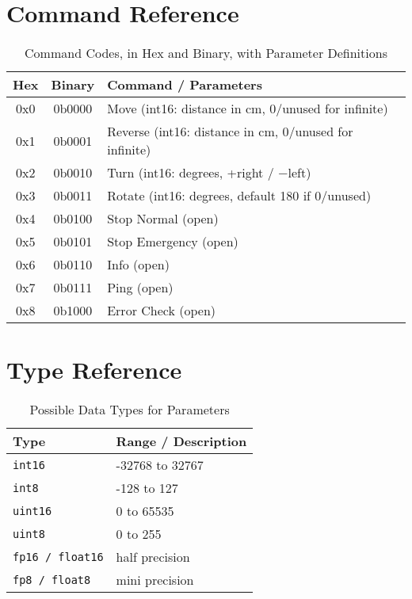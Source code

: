 \documentclass[a4paper,11pt]{article}
\begin{document}
\section{Command Reference}

\begin{table}[h!]
\centering
\begin{tabular}{>{\ttfamily}c >{\ttfamily}c l}
\toprule
\textnormal{Hex} & \textnormal{Binary} & \textnormal{Command / Parameters} \\
\midrule
0x0 & 0b0000 & Move (int16: distance in cm, 0/unused for infinite) \\
0x1 & 0b0001 & Reverse (int16: distance in cm, 0/unused for infinite) \\
0x2 & 0b0010 & Turn (int16: degrees, +right / $-$left) \\
0x3 & 0b0011 & Rotate (int16: degrees, default 180 if 0/unused) \\
0x4 & 0b0100 & Stop Normal (open) \\
0x5 & 0b0101 & Stop Emergency (open) \\
0x6 & 0b0110 & Info (open) \\
0x7 & 0b0111 & Ping (open) \\
0x8 & 0b1000 & Error Check (open) \\
\bottomrule
\end{tabular}
\caption{Command Codes, in Hex and Binary, with Parameter Definitions}
\label{tab:commands}
\end{table}

\section{Type Reference}

\begin{table}[h!]
\centering
\begin{tabular}{l l}
\toprule
\textbf{Type} & \textbf{Range / Description} \\
\midrule
\texttt{int16} & -32768 to 32767 \\
\texttt{int8} & -128 to 127 \\
\texttt{uint16} & 0 to 65535 \\
\texttt{uint8} & 0 to 255 \\
\texttt{fp16 / float16} & half precision \\
\texttt{fp8 / float8} & mini precision \\
\bottomrule
\end{tabular}
\caption{Possible Data Types for Parameters}
\label{tab:types}
\end{table}
\end{document}
